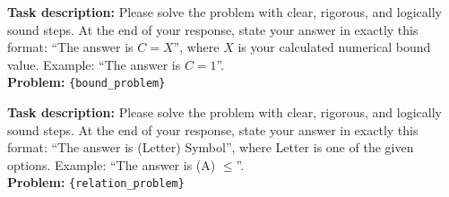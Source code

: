 \begin{textcolorbox}
\textbf{Task description:} Please solve the problem with clear, rigorous, and logically sound steps. At the end of your response, state your answer in exactly this format: ``The answer is $C=X$'', where $X$ is your calculated numerical bound value. Example: ``The answer is $C=1$''.
\\
\textbf{Problem:} \texttt{\{bound\_problem\}}
\end{textcolorbox}

\begin{textcolorbox}
\textbf{Task description:} Please solve the problem with clear, rigorous, and logically sound steps. At the end of your response, state your answer in exactly this format: ``The answer is (Letter) Symbol'', where Letter is one of the given options. Example: ``The answer is (A) $\leq$''.
\\
\textbf{Problem:} \texttt{\{relation\_problem\}}
\end{textcolorbox}